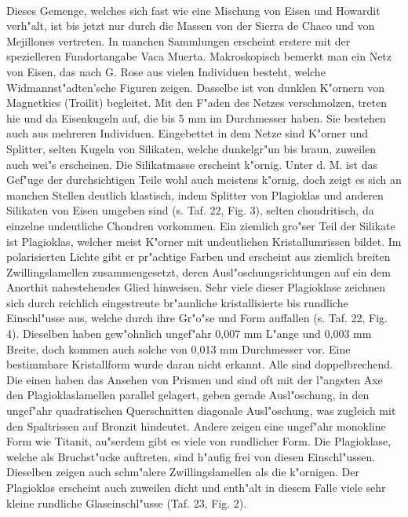 \documentclass[a4paper, 11pt, oneside, polutonikogreek, german]{article}
\begin{document}
\paragraph{}
Dieses Gemenge, welches sich fast wie eine Mischung von Eisen und Howardit verh"alt, ist bis jetzt nur durch die Massen von der Sierra de Chaco und von Mejillones vertreten. In manchen Sammlungen erscheint erstere mit der spezielleren Fundortangabe Vaca Muerta. Makroskopisch bemerkt man ein Netz von Eisen, das nach G. Rose aus vielen Individuen besteht, welche Widmannst"adten'sche Figuren zeigen. Dasselbe ist von dunklen K"ornern von Magnetkies (Troilit) begleitet. Mit den F"aden des Netzes verschmolzen, treten hie und da Eisenkugeln auf, die bis 5 mm im Durchmesser haben. Sie bestehen auch aus mehreren Individuen. Eingebettet in dem Netze sind K"orner und Splitter, selten Kugeln von Silikaten, welche dunkelgr"un bis braun, zuweilen auch wei"s erscheinen. Die Silikatmasse erscheint k"ornig. Unter d. M. ist das Gef"uge der durchsichtigen Teile wohl auch meistens k"ornig, doch zeigt es sich an manchen Stellen deutlich klastisch, indem Splitter von Plagioklas und anderen Silikaten von Eisen umgeben sind (s. Taf. 22, Fig. 3), selten chondritisch, da einzelne undeutliche Chondren vorkommen. Ein ziemlich gro"ser Teil der Silikate ist Plagioklas, welcher meist K"orner mit undeutlichen Kristallumrissen bildet. Im polarisierten Lichte gibt er pr"achtige Farben und erscheint aus ziemlich breiten Zwillingslamellen zusammengesetzt, deren Ausl"oschungsrichtungen auf ein dem Anorthit nahestehendes Glied hinweisen. Sehr viele dieser Plagioklase zeichnen sich durch reichlich eingestreute br"aunliche kristallisierte bis rundliche Einschl"usse aus, welche durch ihre Gr"o"se und Form auffallen (s. Taf. 22, Fig. 4). Dieselben haben gew"ohnlich ungef"ahr 0,007 mm L"ange und 0,003 mm Breite, doch kommen auch solche von 0,013 mm Durchmesser vor. Eine bestimmbare Kristallform wurde daran nicht erkannt. Alle sind doppelbrechend. Die einen haben das Ansehen von Prismen und sind oft mit der l"angsten Axe den Plagioklaslamellen parallel gelagert, geben gerade Ausl"oschung, in den ungef"ahr quadratischen Querschnitten diagonale Ausl"oschung, was zugleich mit den Spaltrissen auf Bronzit hindeutet. Andere zeigen eine ungef"ahr monokline Form wie Titanit, au"serdem gibt es viele von rundlicher Form. Die Plagioklase, welche als Bruchst"ucke auftreten, sind h"aufig frei von diesen Einschl"ussen. Dieselben zeigen auch schm"alere Zwillingslamellen als die k"ornigen. Der Plagioklas erscheint auch zuweilen dicht und enth"alt in diesem Falle viele sehr kleine rundliche Glaseinschl"usse (Taf. 23, Fig. 2).
\end{document}
